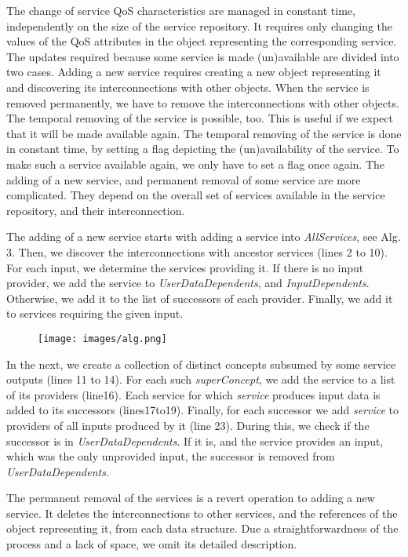 \documentclass[10pt]{llncs}
\begin{document}
The change of service QoS characteristics are managed in constant time, independently on the size of the service repository. It requires only changing the values of the QoS attributes in the object representing the corresponding service. The updates required because some service is made (un)available are divided into two cases. Adding a new service requires creating a new object representing it and discovering its interconnections with other objects. When the service is removed permanently, we have to remove the interconnections with other objects. The temporal removing of the service is possible, too. This is useful if we expect that it will be made available again. The temporal removing of the service is done in constant time, by setting a ﬂag depicting the (un)availability of the service. To make such a service available again, we only have to set a ﬂag once again. The adding of a new service, and permanent removal of some service are more complicated. They depend on the overall set of services available in the service repository, and their interconnection. 

The adding of a new service starts with adding a service into \textit{AllServices}, see Alg. 3. Then, we discover the interconnections with ancestor services (lines 2 to 10). For each input, we determine the services providing it. If there is no input provider, we add the service to \textit{UserDataDependents}, and \textit{InputDependents}. Otherwise, we add it to the list of successors of each provider. Finally, we add it to services requiring the given input.

\begin{figure}[h]
\texttt{[image: images/alg.png]}
\end{figure}

In the next, we create a collection of distinct concepts subsumed by some service outputs (lines 11 to 14). For each such \textit{superConcept}, we add the service to a list of its providers (line16). Each service for which \textit{service} produces input data is added to its successors (lines17to19). Finally, for each successor we add \textit{service} to providers of all inputs produced by it (line 23). During this, we check if the successor is in \textit{UserDataDependents}. If it is, and the service provides an input, which was the only unprovided input, the successor is removed from \textit{UserDataDependents}.

The permanent removal of the services is a revert operation to adding a new service. It deletes the interconnections to other services, and the references of the object representing it, from each data structure. Due a straightforwardness of the process and a lack of space, we omit its detailed description.
\end{document}
